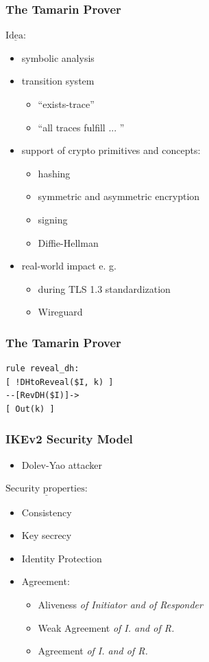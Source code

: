 \documentclass{beamer}
\begin{document}
\begin{frame}
\frametitle{The Tamarin Prover}
$\underline{\text{Idea:}}$  
\begin{itemize}
	\item symbolic analysis
	\item transition system
	\begin{itemize}
		\item ``exists-trace'' 
		\item ``all traces fulfill ... '' 
	\end{itemize}
	\item support of crypto primitives and concepts:
	\begin{itemize}
		\item hashing
		\item symmetric and asymmetric encryption
		\item signing
		\item Diffie-Hellman
	\end{itemize}
	\item real-world impact e. g.
	\begin{itemize}
		\item during TLS 1.3 standardization
		\item Wireguard
	\end{itemize}
\end{itemize}
\end{frame}

\begin{frame}[fragile]
\frametitle{The Tamarin Prover}
\begin{lstlisting}[language=Tamarin]
rule reveal_dh:
[ !DHtoReveal($I, k) ] 
--[RevDH($I)]->       
[ Out(k) ]   
\end{lstlisting}
\end{frame}

\begin{frame}
\frametitle{IKEv2 Security Model}
\begin{itemize}
	\item Dolev-Yao attacker
\end{itemize}
\pause
\bigskip
$\underline{\text{Security properties:}}$              
\pause
\begin{itemize}	
	\item Consistency
	\pause
	\item Key secrecy
	\pause
	\item Identity Protection
	\pause
	\item Agreement: \smallskip
	\pause
	\begin{itemize}
		\item Aliveness \textit{of Initiator and of Responder} 
		\pause        
		\item Weak Agreement \textit{of I. and of R.}
		\pause
		\item Agreement\textit{ of I. and of R.}		
	\end{itemize}
	
\end{itemize}
\end{frame}
\end{document}

